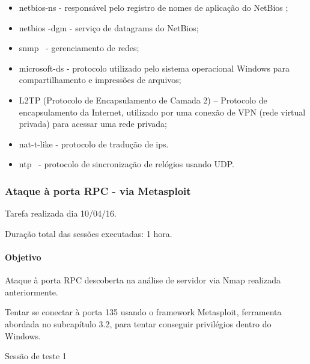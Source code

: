 \documentclass[
    12pt,               %
    openright,          %
    oneside,            %
    a4paper,            %
    section=TITLE,     %
    english,            %
    french,             %
    spanish,            %
    brazil              %
    ]{abntex2}
\newcommand{\citep}{\cite}
\begin{document}
\begin{itemize}
	
\item netbios-ns - responsável pelo registro de nomes de aplicação do NetBios \citep{62208};
	
\item netbios -dgm - serviço de datagrams do NetBios;
	
\item snmp~\citep{62209} - gerenciamento de redes;
	
\item microsoft-ds - protocolo utilizado pelo sistema operacional Windows para compartilhamento e impressões de arquivos;
	
\item L2TP (Protocolo de Encapsulamento de Camada 2) \citep{62215}-- Protocolo de encapsulamento da Internet, utilizado por uma conexão de VPN (rede virtual privada) para acessar uma rede privada;
	
\item nat-t-like - protocolo de tradução de ips.
	
\item ntp \citep{62207}~- protocolo de sincronização de relógios usando UDP.

\end{itemize}




\subsubsection*{Ataque à porta RPC - via Metasploit}





Tarefa realizada dia 10/04/16.


Duração total das sessões executadas: 1 hora.



\paragraph*{Objetivo}

Ataque à porta RPC descoberta na análise de servidor via Nmap realizada anteriormente.


Tentar se conectar à porta 135 usando o framework Metasploit, ferramenta abordada no subcapítulo 3.2, para tentar conseguir privilégios dentro do Windows.


Sessão de teste 1
\end{document}
